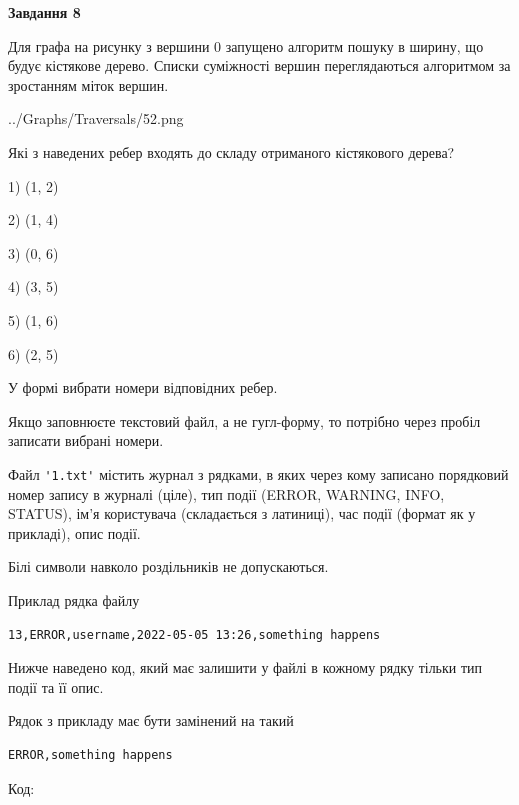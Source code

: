 \documentclass[12pt, ukrainian]{article}
\def\code#1{\Verb!#1!}
\begin{document}
{\begin {large}
{\begin {center}\textbf{Завдання 8}\end {center}}\par
Для графа на рисунку з вершини 0 запущено алгоритм пошуку в ширину, що будує кістякове дерево. Списки суміжності вершин переглядаються алгоритмом за зростанням міток вершин.\par
\begin{center}
	{../Graphs/Traversals/52.png}
\end{center}
\par Які з наведених ребер входять до складу отриманого кістякового дерева?\par
1) (1, 2)\par
2) (1, 4)\par
3) (0, 6)\par
4) (3, 5)\par
5) (1, 6)\par
6) (2, 5)\par
{\vskip 15pt} У формі вибрати номери відповідних ребер.


Якщо заповнюєте текстовий файл, а не гугл-форму, то потрібно через пробіл записа\-ти вибрані номери.\par
\newpage


Файл \code{'1.txt'} містить журнал з рядками, в яких через кому записано поряд\-ко\-вий номер запису в журналі (ціле), тип події (ERROR, WARNING, INFO, STATUS), ім'я користувача (складається з латиниці), час події (фор\-мат як у прикладі), опис події.

Білі символи навколо роздільників не допускаються.

Приклад рядка файлу



\begin{verbatim}
13,ERROR,username,2022-05-05 13:26,something happens
\end{verbatim}


Нижче наведено код, який має залишити у файлі в кожному рядку тільки тип події та її опис.

Рядок з прикладу має бути замінений на такий



\begin{verbatim}
ERROR,something happens
\end{verbatim}




Код:




\end{large}}
\end{document}
